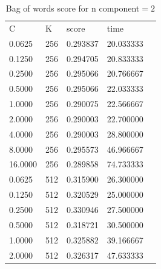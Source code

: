 \documentclass[]{article}
\begin{document}
\begin{table}[]\label{2compTable}
\centering
\caption{Bag of words score for n component$=2$}
\label{2comp}
\begin{tabular}{lllll}
  C      &    K &    score &       time \\                                                                            
0.0625  &  256 & 0.293837 &  20.033333  \\                                                                            
0.1250  &  256 & 0.294705 &  20.833333  \\                                                                            
0.2500  &  256 & 0.295066 &  20.766667  \\                                                                            
0.5000  &  256 & 0.295066 &  22.033333  \\                                                                            
1.0000  &  256 & 0.290075 &  22.566667  \\                                                                            
2.0000  &  256 & 0.290003 &  22.700000  \\                                                                            
4.0000  &  256 & 0.290003 &  28.800000  \\                                                                            
8.0000  &  256 & 0.295573 &  46.966667  \\                                                                            
16.0000 &  256 & 0.289858 &  74.733333  \\                                                                            
0.0625  &  512 & 0.315900 &  26.300000  \\                                                                            
0.1250  &  512 & 0.320529 &  25.000000  \\                                                                            
0.2500  &  512 & 0.330946 &  27.500000  \\                                                                            
0.5000  &  512 & 0.318721 &  30.500000  \\                                                                            
1.0000  &  512 & 0.325882 &  39.166667  \\                                                                            
2.0000  &  512 & 0.326317 &  47.633333  \\                                                                            

\end{tabular}
\end{table}
\end{document}
